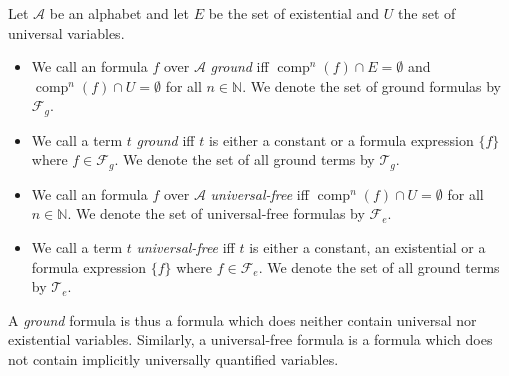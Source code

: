 \begin{definition}
Let $\mathcal{A}$ be an \nthree alphabet and let $E$ be the set of existential and $U$ the set of universal variables.
\begin{itemize}
\item We call an \nthree formula $f$ over $\mathcal{A}$ \emph{ground} 
iff $\operatorname{comp}^n(f)\cap E=\emptyset$ and $\operatorname{comp}^n(f)\cap U=\emptyset$ for all $n\in\mathbb{N}$. We denote the set of ground formulas by $\mathcal{F}_g$.
\item We call a term $t$ \emph{ground} iff $t$ is either a constant or a formula expression $\texttt{\{}f\texttt{\}}$ where $f\in \mathcal{F}_g$. We denote the set of all ground terms by $\mathcal{T}_g$.
\item We call an \nthree formula $f$ over $\mathcal{A}$ \emph{universal-free} 
iff $\operatorname{comp}^n(f)\cap U=\emptyset$ for all $n\in\mathbb{N}$. We denote the set of universal-free formulas by $\mathcal{F}_e$.
\item We call a term $t$ \emph{universal-free} iff $t$ is either a constant, an existential or a formula expression $\texttt{\{}f\texttt{\}}$ where $f\in \mathcal{F}_e$. We denote the set of all ground terms by $\mathcal{T}_e$.
\end{itemize}
\end{definition}

A \emph{ground} formula is thus a formula which does neither contain universal nor existential variables. 
Similarly, a universal-free formula is a formula which does not contain implicitly universally quantified variables. 


